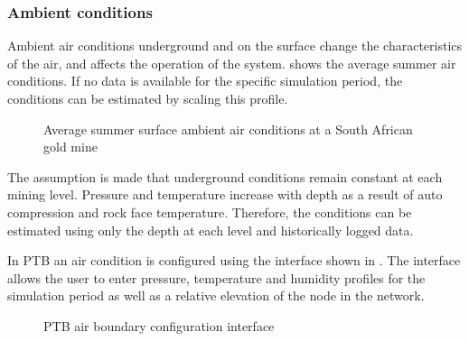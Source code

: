 		\subsubsection{Ambient conditions}
		Ambient air conditions underground and on the surface change the characteristics of the air, and affects the operation of the system.  shows the average summer air conditions. If no data is available for the specific simulation period, the conditions can be estimated by scaling this profile.
		\begin{figure}[h!]
			\centering
			\fbox{}
			\caption{Average summer surface ambient air conditions at a South African gold mine}
			\label{fig: Ambient}
		\end{figure}
		\par
		The assumption is made that underground conditions remain constant at each mining level. Pressure and temperature increase with depth as a result of auto compression and rock face temperature. Therefore, the conditions can be estimated using only the depth at each level and historically logged data.
		\par
		In PTB an air condition is configured using the interface shown in . The interface allows the user to enter pressure, temperature and humidity profiles for the simulation period as well as a relative elevation of the node in the network.
		\clearpage
		\begin{figure}[h]
			\centering
			\caption{PTB air boundary configuration interface}
			\label{fig: BoundaryInput}
		\end{figure}
